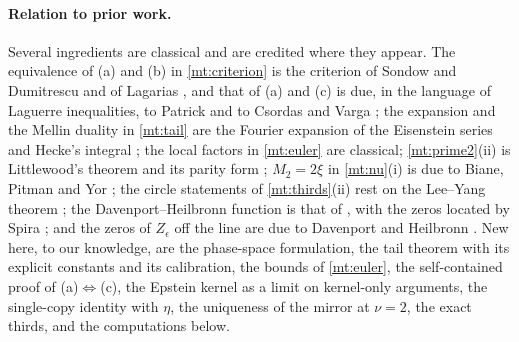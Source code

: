 \documentclass[11pt]{article}
\theoremstyle{definition}\newtheorem{definition}[theorem]{Definition}
\theoremstyle{remark}\newtheorem{remark}[theorem]{Remark}
\begin{document}
\paragraph{Relation to prior work.} Several ingredients are classical and are credited where they appear. The equivalence of (a) and (b) in \cref{mt:criterion} is the criterion of Sondow and Dumitrescu and of Lagarias \cite{SD,Lagarias}, and that of (a) and (c) is due, in the language of Laguerre inequalities, to Patrick and to Csordas and Varga \cite{Patrick,CV}; the expansion and the Mellin duality in \cref{mt:tail} are the Fourier expansion of the Eisenstein series and Hecke's integral \cite{Iwaniec}; the local factors in \cref{mt:euler} are classical; \cref{mt:prime2}(ii) is Littlewood's theorem and its parity form \cite{Littlewood,Borwein}; $M_2=2\xi$ in \cref{mt:nu}(i) is due to Biane, Pitman and Yor \cite{BPY}; the circle statements of \cref{mt:thirds}(ii) rest on the Lee--Yang theorem \cite{LeeYang,Griffiths69}; the Davenport--Heilbronn function is that of \cite{DH}, with the zeros located by Spira \cite{Spira}; and the zeros of $Z_\epsilon$ off the line are due to Davenport and Heilbronn \cite{DH}. New here, to our knowledge, are the phase-space formulation, the tail theorem with its explicit constants and its calibration, the bounds of \cref{mt:euler}, the self-contained proof of (a)$\Leftrightarrow$(c), the Epstein kernel as a limit on kernel-only arguments, the single-copy identity with $\eta$, the uniqueness of the mirror at $\nu=2$, the exact thirds, and the computations below.
\end{document}

